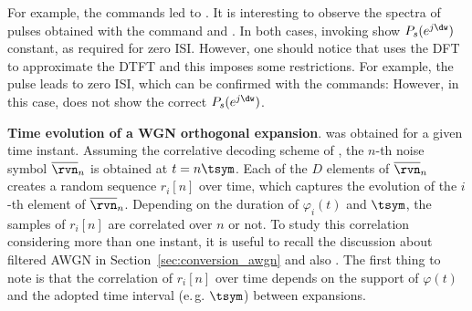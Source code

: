 For example, the commands  led to . It is interesting to observe the spectra of pulses obtained with the command  and . In both cases, invoking  show $P_s(e^{j\dw})$ constant, as required for zero ISI. However, one should notice that  uses the DFT to approximate the DTFT and this imposes some restrictions. For example, the pulse  leads to zero ISI, which can be confirmed with the commands:
However, in this case,  does not show the correct $P_s(e^{j\dw})$.
\eApplication

\bApplication
\textbf{Time evolution of a WGN orthogonal expansion}.
\label{app:xcorrWGN}
%
%
 was obtained for a given time instant. 
Assuming the correlative decoding scheme of , the $n$-th noise symbol $\overline \rvn_n$ is obtained at $t=n \tsym$. Each of the $D$ elements of $\overline \rvn_n$ creates a random sequence $r_i[n]$ over time, which captures the evolution of the $i$-th element of $\overline \rvn_n$. Depending on the duration of $\varphi_i(t)$ and $\tsym$, the samples of $r_i[n]$ are correlated over $n$ or not. 
To study this correlation considering more than one instant, it is useful to recall the discussion about filtered AWGN in Section~\ref{sec:conversion_awgn} and also .
The first thing to note is that the correlation of $r_i[n]$ over time depends on the support of $\varphi(t)$ and the adopted time interval (e.\,g. $\tsym$) between expansions.

